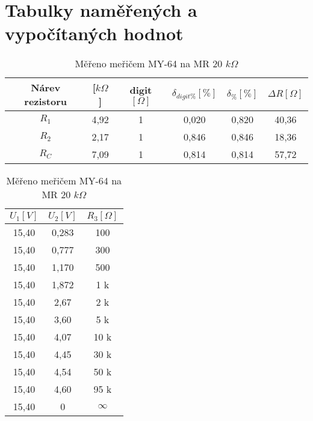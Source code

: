 \section{Tabulky naměřených a vypočítaných hodnot}
  \begin{table}[H]
    \centering
    \begin{tabular}[htbp]{|c|c|c|c|c|c|}
      \hline
      \textbf{Nárev rezistoru} & \textbf{[$k\Omega$]} & digit $[\Omega]$ & $\delta _{digit\%} [\%]$ & $\delta _\% [\%]$ & $\Delta R [\Omega]$ \\
      \hline
      $R_1$ & 4,92 & 1 & 0,020 & 0,820 & 40,36\\
      $R_2$ & 2,17 & 1 & 0,846 & 0,846 & 18,36\\
      $R_C$ & 7,09 & 1 & 0,814 & 0,814 & 57,72\\
      \hline
    \end{tabular}
    \caption{Měřeno meřičem MY-64 na MR 20 $k\Omega$}
  \end{table}
  \begin{table}[H]
    \centering
    \begin{tabular}[htbp]{|c|c|c|}
      \hline
      $U_1 [V]$ & $U_2 [V]$ & $R_3 [\Omega]$ \\
      \hline
      15,40 & 0,283 & 100 \\
      15,40 & 0,777 & 300 \\
      15,40 & 1,170 & 500 \\
      15,40 & 1,872 & 1 k \\
      15,40 & 2,67 & 2 k \\
      15,40 & 3,60 & 5 k \\
      15,40 & 4,07 & 10 k \\
      15,40 & 4,45 & 30 k \\
      15,40 & 4,54 & 50 k \\
      15,40 & 4,60 & 95 k \\
      15,40 & 0 & $\infty$ \\
     
      \hline
    \end{tabular}
    \caption{Měřeno meřičem MY-64 na MR 20 $k\Omega$}
  \end{table}
